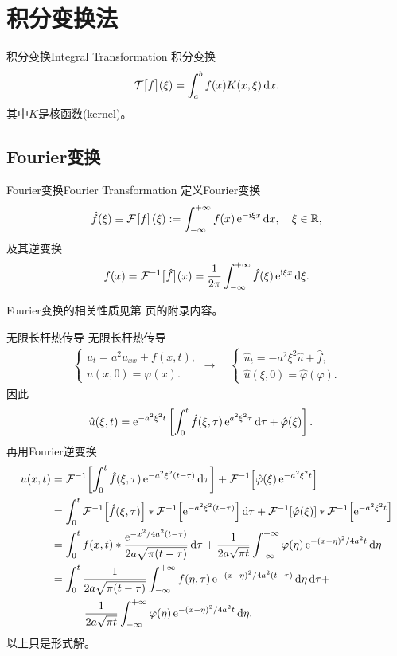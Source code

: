 \chapter{积分变换法}
\begin{definition}{积分变换}{Integral Transformation}
	积分变换
	\[
		\mathcal T\bigl[f\bigr](\xi)=\int_a^bf(x)K(x,\xi)\mathop{}\!\mathrm{d} x.
	\]
	其中$K$是核函数(kernel)。
\end{definition}
\section{Fourier变换}
\setcounter{subsubsection}{1}
\begin{definition}{Fourier变换}{Fourier Transformation}
	定义Fourier变换
	\[
		\hat f(\xi)\equiv\mathcal F_{\mathrm{{}}}\left[f\right](\xi):=\int_{-\infty}^{+\infty} f(x)\mathop{}\!\mathrm{e}^{-\mathrm{i}\xi x}\mathop{}\!\mathrm{d} x,\quad \xi\in\mathbb R,
	\]
	及其逆变换
	\[
		f(x)=\mathcal F^{-1}\big[\hat f\big](x)=\frac1{2\pi}\int_{-\infty}^{+\infty}\hat f(\xi)\mathop{}\!\mathrm{e}^{\mathrm{i}\xi x}\mathop{}\!\mathrm{d}\xi.
	\]
\end{definition}
Fourier变换的相关性质见第 \pageref{The Property of Fourier Transformation} 页的附录内容。
\begin{example}{无限长杆热传导}{}
	无限长杆热传导
	\begin{align*}
		\begin{cases}
			u_t=a^2u_{xx}+f(x,t),\\
			u(x,0)=\varphi(x).
		\end{cases}\longrightarrow\quad\begin{cases}
			\hat u_t=-a^2\xi^2\hat u+\hat f,\\
			\hat u(\xi,0)=\hat\varphi(\varphi).
		\end{cases}
	\end{align*}
	因此
	\begin{align*}
		\hat u(\xi,t)&=\mathop{}\!\mathrm{e}^{-a^2\xi^2t}\left[\int_0^t\hat f(\xi,\tau)\mathop{}\!\mathrm{e}^{a^2\xi^2\tau}\mathop{}\!\mathrm{d}\tau+\hat\varphi(\xi)\right].
	\end{align*}
	再用Fourier逆变换
	\begin{align*}
		u(x,t)&=\cfi{\int_0^t\hat f(\xi,\tau)\e{-a^2\xi^2(t-\tau)}\d\tau}+\cfi{\hat\varphi(\xi)\e{-a^2\xi^2t}}\\
		&=\int_0^t\cfi{\hat f(\xi,\tau)}\ast\cfi{\e{-a^2\xi^2(t-\tau)}}\d\tau+\cfi{\hat\varphi(\xi)}\ast\cfi{\e{-a^2\xi^2t}}\\
		&=\int_0^tf(x,t)\ast\frac{\e{-x^2/4a^2(t-\tau)}}{2a\sqrt{\pi(t-\tau)}}\d\tau+\frac1{2a\sqrt{\pi t}}\int\iti\varphi(\eta)\e{-(x-\eta)^2/4a^2t}\d\eta\\
		&=\int_0^t\frac1{2a\sqrt{\pi(t-\tau)}}\int\iti f(\eta,\tau)\e{-(x-\eta)^2/4a^2(t-\tau)}\d\eta\d\tau+\\
		&\qqquad\frac1{2a\sqrt{\pi t}}\int\iti\varphi(\eta)\e{-(x-\eta)^2/4a^2t}\d\eta.
	\end{align*}
	以上只是形式解。
\end{example}
